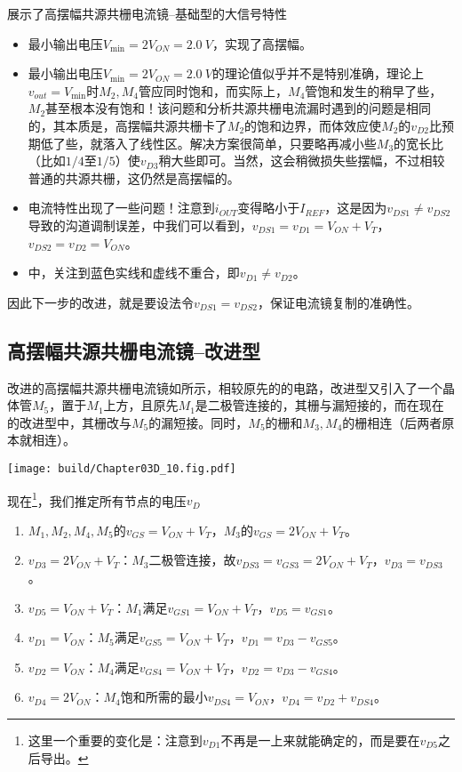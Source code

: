 展示了高摆幅共源共栅电流镜--基础型的大信号特性
\begin{itemize}
    \item 最小输出电压$V_{\min}=2V_{ON}=\SI{2.0}{V}$，实现了高摆幅。
    \item 最小输出电压$V_{\min}=2V_{ON}=\SI{2.0}{V}$的理论值似乎并不是特别准确，理论上$v_{out}=V_{\min}$时$M_2,M_4$管应同时饱和，而实际上，$M_4$管饱和发生的稍早了些，$M_2$甚至根本没有饱和！该问题和分析共源共栅电流漏时遇到的问题是相同的，其本质是，高摆幅共源共栅卡了$M_2$的饱和边界，而体效应使$M_2$的$v_{D2}$比预期低了些，就落入了线性区。解决方案很简单，只要略再减小些$M_3$的宽长比（比如$1/4$至$1/5$）使$v_{D3}$稍大些即可。当然，这会稍微损失些摆幅，不过相较普通的共源共栅，这仍然是高摆幅的。
    \item 电流特性出现了一些问题！注意到$i_{OUT}$变得略小于$I_{REF}$，这是因为$v_{DS1}\neq v_{DS2}$导致的沟道调制误差，中我们可以看到，$v_{DS1}=v_{D1}=V_{ON}+V_T$，$v_{DS2}=v_{D2}=V_{ON}$。
    \item {}中，关注到蓝色实线和虚线不重合，即$v_{D1}\neq v_{D2}$。
\end{itemize}


因此下一步的改进，就是要设法令$v_{DS1}=v_{DS2}$，保证电流镜复制的准确性。\goodbreak

\subsection{高摆幅共源共栅电流镜--改进型}
改进的高摆幅共源共栅电流镜如所示，相较原先的的电路，改进型又引入了一个晶体管$M_5$，置于$M_1$上方，且原先$M_1$是二极管连接的，其栅与漏短接的，而在现在的改进型中，其栅改与$M_5$的漏短接。同时，$M_5$的栅和$M_3,M_4$的栅相连（后两者原本就相连）。\nopagebreak

\begin{Figure}
    \texttt{[image: build/Chapter03D\_10.fig.pdf]}
\end{Figure}

现在\footnote{这里一个重要的变化是：注意到$v_{D1}$不再是一上来就能确定的，而是要在$v_{D5}$之后导出。}，我们推定所有节点的电压$v_D$
\begin{enumerate}
    \item $M_1,M_2,M_4,M_5$的$v_{GS}=V_{ON}+V_T$，$M_3$的$v_{GS}=2V_{ON}+V_T$。
    \item $v_{D3}=2V_{ON}+V_T$：$M_3$二极管连接，故$v_{DS3}=v_{GS3}=2V_{ON}+V_T$，$v_{D3}=v_{DS3}$。
    \item $v_{D5}=V_{ON}+V_T$：$M_1$满足$v_{GS1}=V_{ON}+V_T$，$v_{D5}=v_{GS1}$。
    \item $v_{D1}=V_{ON}$：$M_5$满足$v_{GS5}=V_{ON}+V_T$，$v_{D1}=v_{D3}-v_{GS5}$。
    \item $v_{D2}=V_{ON}$：$M_4$满足$v_{GS4}=V_{ON}+V_T$，$v_{D2}=v_{D3}-v_{GS4}$。
    \item $v_{D4}=2V_{ON}$：$M_4$饱和所需的最小$v_{DS4}=V_{ON}$，$v_{D4}=v_{D2}+v_{DS4}$。
\end{enumerate}

